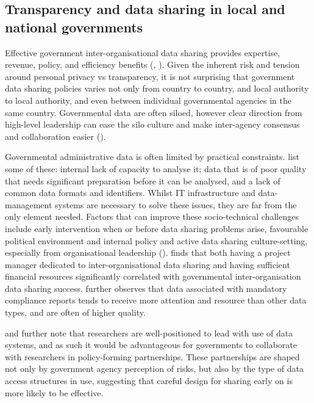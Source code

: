 \documentclass{CUP-JNL-DAP}%
\begin{document}
\subsection{Transparency and data sharing in local and national governments}

Effective government inter-organisational data sharing provides expertise, revenue, policy, and efficiency benefits (\cite{gil-garcia_government_2016}, \cite{ramon_gil-garcia_collaborative_2007}). Given the inherent risk and tension around personal privacy vs transparency, it is not surprising that government data sharing policies varies not only from country to country, and local authority to local authority, and even between individual governmental agencies in the same country. Governmental data are often siloed, however clear direction from high-level leadership can ease the silo culture and make inter-agency consensus and collaboration easier (\cite{graham_navigating_2016}). 

Governmental administrative data is often limited by practical constraints. \cite{allard_state_2018} list some of these: internal lack of capacity to analyse it; data that is of poor quality that needs significant preparation before it can be analysed, and a lack of common data formats and identifiers. Whilst IT infrastructure and data-management systems are necessary to solve these issues, they are far from the only element needed. Factors that can improve these socio-technical challenges include early intervention when or before data sharing problems arise, favourable political environment and internal policy and active data sharing culture-setting, especially from organisational leadership (\cite{dawes_need_2009}). \cite{gil-garcia_government_2016} finds that both having a project manager dedicated to inter-organisational data sharing and having sufficient financial resources significantly correlated with governmental inter-organisation data sharing success.  \cite{allard_state_2018} further observes that data associated with mandatory compliance reports tends to receive more attention and resource than other data types, and are often of higher quality.

\cite{allard_state_2018} and \cite{graham_navigating_2016} further note that researchers are well-positioned to lead with use of data systems, and as such it would be advantageous for governments to collaborate with researchers in policy-forming partnerships. These partnerships are shaped not only by government agency perception of risks, but also by the type of data access structures in use, suggesting that careful design for sharing early on is more likely to be effective. 
\end{document}
